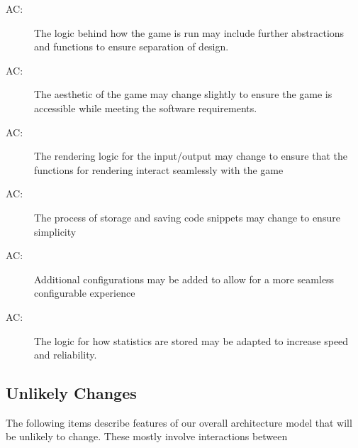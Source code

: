 \documentclass[12pt, titlepage]{article}
\newcounter{acnum}
\newcommand{\actheacnum}{AC\theacnum}
\begin{document}

\begin{description}
\item[ \actheacnum \label{acGame}:] The logic behind how the game is run may include further abstractions and functions to ensure separation of design.
\item[ \actheacnum \label{acAe}:] The aesthetic of the game may change slightly to ensure the game is accessible while meeting the software requirements.
\item [ \actheacnum \label{acSc}:] The rendering logic for the input/output may change to ensure that the functions for rendering interact seamlessly with the game
\item [ \actheacnum \label{acSn}:] The process of storage and saving code snippets may change to ensure simplicity
\item [ \actheacnum \label{acCg}:] Additional configurations may be added to allow for a more seamless configurable experience
\item [ \actheacnum \label{acSt}:] The logic for how statistics are stored may be adapted to increase speed and reliability.
\end{description}

\subsection{Unlikely Changes} \label{SecUchange}

The following items describe features of our overall architecture model that will be unlikely to change. These mostly involve interactions between 

\end{document}
